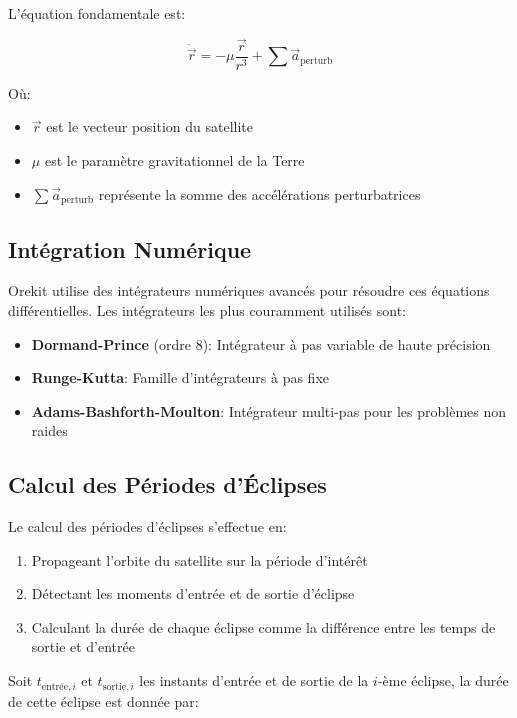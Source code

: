 \documentclass[12pt,a4paper]{article}
\begin{document}
L'équation fondamentale est:

\begin{equation}
\ddot{\vec{r}} = -\mu \frac{\vec{r}}{r^3} + \sum \vec{a}_{\text{perturb}}
\end{equation}

Où:
\begin{itemize}
    \item $\vec{r}$ est le vecteur position du satellite
    \item $\mu$ est le paramètre gravitationnel de la Terre
    \item $\sum \vec{a}_{\text{perturb}}$ représente la somme des accélérations perturbatrices
\end{itemize}

\subsection{Intégration Numérique}

Orekit utilise des intégrateurs numériques avancés pour résoudre ces équations différentielles. Les intégrateurs les plus couramment utilisés sont:

\begin{itemize}
    \item \textbf{Dormand-Prince} (ordre 8): Intégrateur à pas variable de haute précision
    \item \textbf{Runge-Kutta}: Famille d'intégrateurs à pas fixe
    \item \textbf{Adams-Bashforth-Moulton}: Intégrateur multi-pas pour les problèmes non raides
\end{itemize}

\subsection{Calcul des Périodes d'Éclipses}

Le calcul des périodes d'éclipses s'effectue en:

\begin{enumerate}
    \item Propageant l'orbite du satellite sur la période d'intérêt
    \item Détectant les moments d'entrée et de sortie d'éclipse
    \item Calculant la durée de chaque éclipse comme la différence entre les temps de sortie et d'entrée
\end{enumerate}

Soit $t_{\text{entrée},i}$ et $t_{\text{sortie},i}$ les instants d'entrée et de sortie de la $i$-ème éclipse, la durée de cette éclipse est donnée par:
\end{document}
